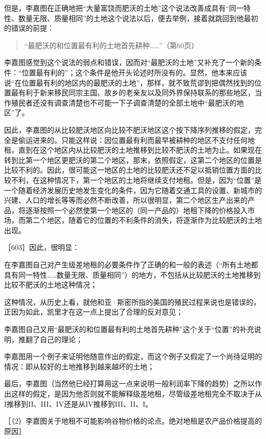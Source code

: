 但是，李嘉图在正确地把“大量富饶而肥沃的土地”这个说法改善成具有“同一特性、数量无限、质量相同”的土地这个说法以后，便去举例，接着就跳回到他最初的错误的前提：

\begin{quote}{“最肥沃的和位置最有利的土地首先耕种……”（第60页）}\end{quote}

李嘉图感觉到这个说法的弱点和错误，因而对“最肥沃的土地”又补充了一个新的条件：“位置最有利的”；这个条件是他开头论述时所没有的。显然，他本来应该说“在位置最有利的地区内的最肥沃的土地”，那样，就不致荒谬到把偶然找到的位置最有利于新来移民同宗主国、故乡的老亲友以及同外界保持联系的那些地区，当作殖民者还没有调查清楚也不可能一下子调查清楚的全部土地中“最肥沃的地区”了。

因此，李嘉图的从比较肥沃地区向比较不肥沃地区这个按下降序列推移的假定，完全是偷运进来的。只能这样说：因位置最有利而最早被耕种的地区不支付任何地租，直到在这个地区内从比较肥沃的土地推移到比较不肥沃的土地为止。如果现在转到比第一个地区更肥沃的第二个地区，那末，依照假定，这第二个地区的位置是比较不利的。因此，很可能这一地区的土地的比较肥沃还不足以抵销位置方面的比较不利，在这种情况下，第一个地区的土地将继续支付地租。但是，因为“位置”是一个随着经济发展历史地发生变化的条件，因为它随着交通工具的设置、新城市的兴建、人口的增长等等而必然不断改善，所以很明显，第二个地区生产出来的产品，将逐渐按照一个必然使第一个地区的（同一产品的）地租下降的价格投入市场，而第二个地区，随着它的位置的不利条件的消失，将逐渐作为比较肥沃的土地出现。

［603］因此，很明显：

在李嘉图自己对产生级差地租的必要条件作了正确的和一般的表述（“所有土地都具有同一特性……数量无限、质量相同”）的地方，不包括从比较肥沃的土地推移到比较不肥沃的土地这种情况；

这种情况，从历史上看，就他和亚·斯密所指的美国的殖民过程来说也是错误的，正因为如此，凯里才在这一点上提出了合理的反对意见；

李嘉图自己又用“最肥沃的和位置最有利的土地首先耕种”这个关于“位置”的补充说明，推翻了自己的理论；

李嘉图用一个例子来证明他随意作出的假定，而这个例子又假定了一个尚待证明的情况：即从较好的土地推移到越来越坏的土地；

最后，李嘉图｛当然他已经打算用这一点来说明一般利润率下降的趋势｝之所以作出这样的假定，是因为他否则就不能解释级差地租，尽管级差地租完全不取决于从I推移到II、III、IV还是从IV推移到III、II、I。

［（2）李嘉图关于地租不可能影响谷物价格的论点。绝对地租是农产品价格提高的原因］

